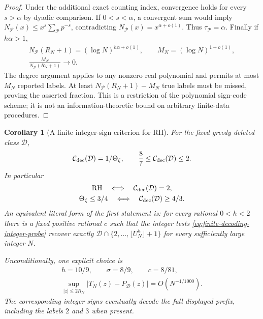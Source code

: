 \documentclass[11pt]{article}
\newtheorem{corollary}[theorem]{Corollary}
\theoremstyle{definition}
\begin{document}
\begin{proof}
Under the additional exact counting index,
convergence holds for every $s>\alpha$ by dyadic comparison.
If $0<s<\alpha$, a convergent sum would imply
$N_{\mathcal P}(x)\le x^s\sum_{\mathcal P}p^{-s}$,
contradicting $N_{\mathcal P}(x)=x^{\alpha+o(1)}$.
Thus $\tau_{\mathcal P}=\alpha$.
Finally if $h\alpha>1$,
\[
 \begin{gathered}
 N_{\mathcal P}(R_N+1)=(\log N)^{h\alpha+o(1)},\qquad
       M_N=(\log N)^{1+o(1)},\\
       \frac{M_N}{N_{\mathcal P}(R_N+1)}\longrightarrow0 .
 \end{gathered}
\]
The degree argument applies to any nonzero real polynomial
and permits at most $M_N$ reported labels.
At least $N_{\mathcal P}(R_N+1)-M_N$ true labels must be
missed, proving the asserted fraction.
This is a restriction of the polynomial sign-code scheme;
it is not an information-theoretic bound on arbitrary
finite-data procedures.
\end{proof}

\begin{corollary}[A finite integer-sign criterion for RH]
\label{cor:prime-decoding-RH}
For the fixed greedy deleted class $\mathcal D$,
\begin{equation}
 \mathcal C_{\rm dec}(\mathcal D)=1/\Theta_\zeta,\qquad
               \frac87\le\mathcal C_{\rm dec}(\mathcal D)\le2 .
 \label{eq:prime-decoding-zero-supremum}
\end{equation}
In particular
\begin{equation}
 \begin{gathered}
 {\rm RH}\quad\Longleftrightarrow\quad
                   \mathcal C_{\rm dec}(\mathcal D)=2,\\
 \Theta_\zeta\le3/4\quad\Longleftrightarrow\quad
                   \mathcal C_{\rm dec}(\mathcal D)\ge4/3 .
 \end{gathered}
 \label{eq:prime-decoding-RH-equivalences}
\end{equation}
An equivalent literal form of the first statement is:
for every rational $0<h<2$ there is a fixed positive rational
$c$ such that the integer tests
\eqref{eq:finite-decoding-integer-probe} recover exactly
$\mathcal D\cap\{2,\ldots,\lfloor U_N^h\rfloor+1\}$ for
every sufficiently large integer $N$.

Unconditionally, one explicit choice is
\begin{equation}
 \begin{gathered}
 h=10/9,\qquad \sigma=8/9,\qquad c=8/81,\\
 \sup_{|z|\le2R_N}|T_N(z)-P_{\mathcal D}(z)|
                          =O(N^{-1/1000}).
 \end{gathered}
 \label{eq:prime-decoding-explicit-unconditional}
\end{equation}
The corresponding integer signs eventually decode the full
displayed prefix, including the labels $2$ and $3$ when present.
\end{corollary}
\end{document}

